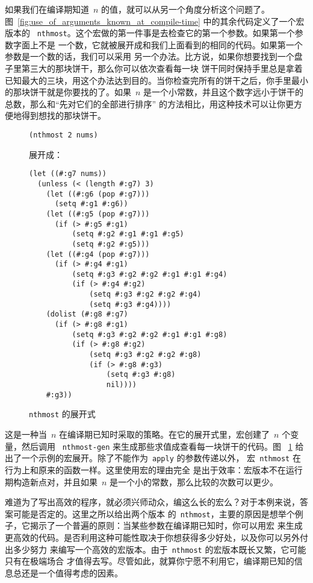 如果我们在编译期知道~$n$ 的值，就可以从另一个角度分析这个问题了。
图~\ref{fig:use_of_arguments_known_at_compile-time} 中的其余代码定义了一个宏版本的
~\verb|nthmost|。这个宏做的第一件事是去检查它的第一个参数。如果第一个参数字面上不是
一个数，它就被展开成和我们上面看到的相同的代码。如果第一个参数是一个数的话，我们可以采用
另一个办法。比方说，如果你想要找到一个盘子里第三大的那块饼干，那么你可以依次查看每一块
饼干同时保持手里总是拿着已知最大的三块，用这个办法达到目的。当你检查完所有的饼干之后，你手里最小
的那块饼干就是你要找的了。如果~$n$ 是一个小常数，并且这个数字远小于饼干的总数，那么和``先对它们的全部进行排序''
的方法相比，用这种技术可以让你更方便地得到想找的那块饼干。

\begin{figure}
\begin{lstlisting}
(nthmost 2 nums)
\end{lstlisting}
展开成：
\begin{lstlisting}
(let ((#:g7 nums))
  (unless (< (length #:g7) 3)
    (let ((#:g6 (pop #:g7)))
      (setq #:g1 #:g6))
    (let ((#:g5 (pop #:g7)))
      (if (> #:g5 #:g1)
          (setq #:g2 #:g1 #:g1 #:g5)
          (setq #:g2 #:g5)))
    (let ((#:g4 (pop #:g7)))
      (if (> #:g4 #:g1)
          (setq #:g3 #:g2 #:g2 #:g1 #:g1 #:g4)
          (if (> #:g4 #:g2)
              (setq #:g3 #:g2 #:g2 #:g4)
              (setq #:g3 #:g4))))
    (dolist (#:g8 #:g7)
      (if (> #:g8 #:g1)
          (setq #:g3 #:g2 #:g2 #:g1 #:g1 #:g8)
          (if (> #:g8 #:g2)
              (setq #:g3 #:g2 #:g2 #:g8)
              (if (> #:g8 #:g3)
                  (setq #:g3 #:g8)
                  nil))))
    #:g3))
\end{lstlisting}
  \caption{\texttt{nthmost} 的展开式}
  \label{fig:expansion_of_nthmost}
\end{figure}

这是一种当~$n$ 在编译期已知时采取的策略。在它的展开式里，宏创建了~$n$ 个变量，然后调用
~\verb|nthmost-gen| 来生成那些求值成查看每一块饼干的代码。图
~\ref{fig:expansion_of_nthmost} 给出了一个示例的宏展开。除了不能作为~\verb|apply| 的参数传递以外，
宏~\verb|nthmost| 在行为上和原来的函数一样。这里使用宏的理由完全
是出于效率：宏版本不在运行期构造新点对，并且如果~$n$ 是一个小的常数，那么比较的次数可以更少。

难道为了写出高效的程序，就必须兴师动众，编这么长的宏么？对于本例来说，答案可能是否定的。这里之所以给出两个版本
的~\verb|nthmost|，主要的原因是想举个例子，它揭示了一个普遍的原则：当某些参数在编译期已知时，你可以用宏
来生成更高效的代码。是否利用这种可能性取决于你想获得多少好处，以及你可以另外付出多少努力
来编写一个高效的宏版本。由于~\verb|nthmost| 的宏版本既长又繁，它可能只有在极端场合
才值得去写。尽管如此，就算你宁愿不利用它，编译期已知的信息总还是一个值得考虑的因素。

